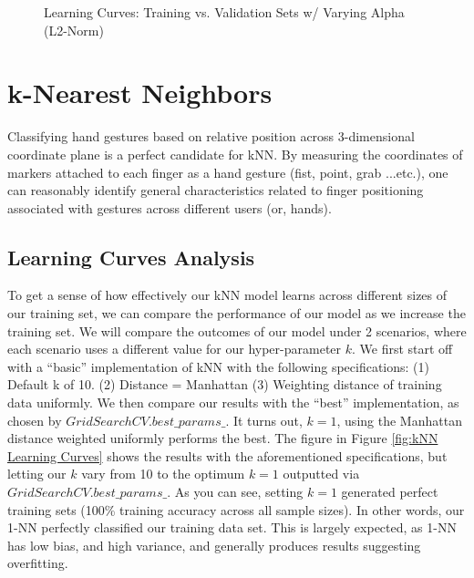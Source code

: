 \documentclass[letterpaper,12pt]{article}
\begin{document}
\begin{figure} %
  \centering
  \hspace{8pt}%
  \caption{Learning Curves:  Training vs. Validation Sets w/ Varying Alpha (L2-Norm)}\label{fig:ANN Learning Curves}
\end{figure}

\section{k-Nearest Neighbors}
Classifying hand gestures based on relative position across 3-dimensional coordinate plane is a perfect candidate for kNN.  By measuring the coordinates of markers attached to each finger as a hand gesture (fist, point, grab ...etc.), one can reasonably identify general characteristics related to finger positioning associated with gestures across different users (or, hands).

\subsection{Learning Curves Analysis}
To get a sense of how effectively our kNN model learns across different sizes of our training set, we can compare the performance of our model as we increase the training set.  We will compare the outcomes of our model under 2 scenarios, where each scenario uses a different value for our hyper-parameter $k$.  We first start off with a ``basic'' implementation of kNN with the following specifications:  (1) Default k of 10.  (2) Distance = Manhattan (3) Weighting distance of training data uniformly. We then compare our results with the ``best'' implementation, as chosen by $GridSearchCV.best\_params\_$.  It turns out, $ k=1$, using the Manhattan distance weighted uniformly performs the best.  The figure in Figure \ref{fig:kNN Learning Curves} shows the results with the aforementioned specifications, but letting our $k$ vary from 10 to the optimum $k=1$ outputted via $GridSearchCV.best\_params\_$.  As you can see, setting $k=1$ generated perfect training sets (100\% training accuracy across all sample sizes).  In other words, our 1-NN perfectly classified our training data set.  This is largely expected, as 1-NN has low bias, and high variance, and generally produces results suggesting overfitting.  
\end{document}
